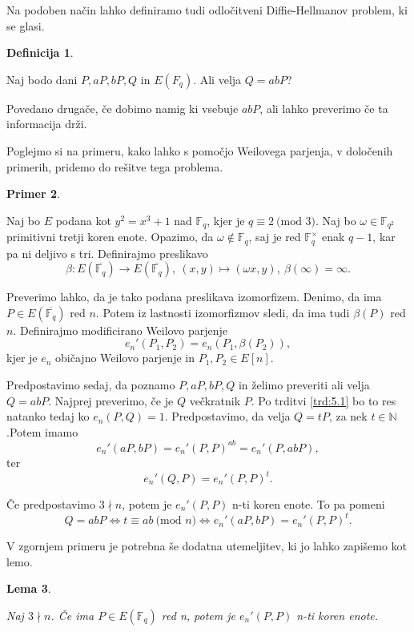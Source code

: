 \documentclass[12pt,a4paper,twoside]{article}
\theoremstyle{definition} %
\newtheorem{definicija}{Definicija}[section]
\newtheorem{primer}[definicija]{Primer}
\theoremstyle{plain} %
\newtheorem{lema}[definicija]{Lema}
\numberwithin{equation}{section}  %
\newcommand{\N}{\mathbb N}
\newcommand{\F}{\mathbb F}
\newcommand{\E}[1]{E({#1})}
\newcommand{\MOD}[1]{\ \text{(mod }{#1}\text{)}}
\begin{document}
Na podoben način lahko definiramo tudi odločitveni Diffie-Hellmanov problem, ki se glasi.
\begin{definicija}~

Naj bodo dani $P,aP,bP,Q$ in $\E{F_q}$. Ali velja $Q = abP$?
\end{definicija}

Povedano drugače, če dobimo namig ki vsebuje $abP$, ali lahko preverimo če ta informacija drži.

Poglejmo si na primeru, kako lahko s pomočjo Weilovega parjenja, v določenih primerih, pridemo do rešitve tega problema.

\begin{primer}~

Naj bo $E$ podana kot $y^2=x^3+1$ nad $\F_q$, kjer je $q \equiv 2 \MOD{3}$. Naj bo $\omega \in \F_{q^2}$ primitivni tretji koren enote. Opazimo, da $\omega \notin \F_q$, saj je red $\F^{\times}_q$ enak $q-1$, kar pa ni deljivo s tri.
Definirajmo preslikavo
$$\beta:\E{\overline{\F_q}} \rightarrow \E{\overline{\F_q}}, \ (x,y) \mapsto (\omega x,y), \ \beta(\infty) = \infty.$$

Preverimo lahko, da je tako podana preslikava izomorfizem. Denimo, da ima $P \in \E{\overline{\F_q}}$ red $n$. Potem iz lastnosti izomorfizmov sledi, da ima tudi $\beta(P)$ red $n$.
Definirajmo modificirano Weilovo parjenje
$$e_n'(P_1,P_2) = e_n(P_1,\beta(P_2)),$$
kjer je $e_n$ običajno Weilovo parjenje in $P_1,P_2 \in E[n]$.

Predpostavimo sedaj, da poznamo $P,aP,bP,Q$ in želimo preveriti ali velja $Q=abP$. Najprej preverimo, če je $Q$ večkratnik $P$. Po trditvi \ref{trd:5.1} bo to res natanko tedaj ko $e_n(P,Q) = 1$.
Predpostavimo, da velja $Q = tP$, za nek $t \in \N$.Potem imamo
$$e_n'(aP,bP)=e_n'(P,P)^{ab} = e_n'(P,abP),$$
ter
$$e_n'(Q,P) = e_n'(P,P)^t.$$

Če predpostavimo $3 \nmid n$, potem je $e_n'(P,P)$ n-ti koren enote. To pa pomeni
$$Q=abP \iff t \equiv ab \MOD{n} \iff e_n'(aP,bP)=e_n'(P,P)^t.$$
\end{primer}

V zgornjem primeru je potrebna še dodatna utemeljitev, ki jo lahko zapišemo kot lemo.

\begin{lema}~

\label{lema:6.1}
Naj $3 \nmid n$. Če ima $P \in \E{\F_q}$ red n, potem je $e_n'(P,P)$ n-ti koren enote.
\end{lema}
\end{document}
